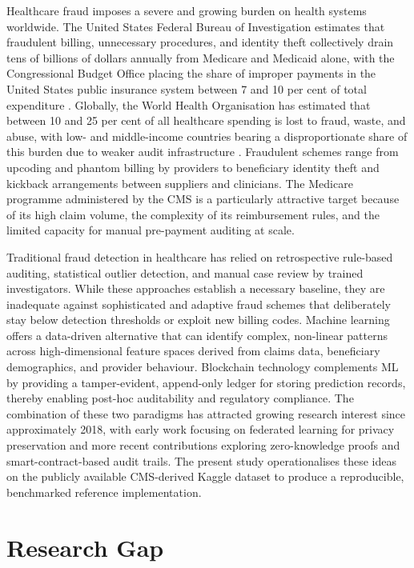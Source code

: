 Healthcare fraud imposes a severe and growing burden on health systems worldwide.
The United States Federal Bureau of Investigation estimates that fraudulent
billing, unnecessary procedures, and identity theft collectively drain tens of
billions of dollars annually from Medicare and Medicaid alone, with the
Congressional Budget Office placing the share of improper payments in the United
States public insurance system between 7 and 10 per cent of total expenditure
\cite{fbi2021,cbo2022}. Globally, the World Health Organisation has estimated
that between 10 and 25 per cent of all healthcare spending is lost to fraud,
waste, and abuse, with low- and middle-income countries bearing a
disproportionate share of this burden due to weaker audit infrastructure
\cite{who2010}. Fraudulent schemes range from upcoding and phantom billing by
providers to beneficiary identity theft and kickback arrangements between
suppliers and clinicians. The Medicare programme administered by the CMS is a
particularly attractive target because of its high claim volume, the complexity
of its reimbursement rules, and the limited capacity for manual pre-payment
auditing at scale.

Traditional fraud detection in healthcare has relied on retrospective rule-based
auditing, statistical outlier detection, and manual case review by trained
investigators. While these approaches establish a necessary baseline, they are
inadequate against sophisticated and adaptive fraud schemes that deliberately
stay below detection thresholds or exploit new billing codes. Machine learning
offers a data-driven alternative that can identify complex, non-linear patterns
across high-dimensional feature spaces derived from claims data, beneficiary
demographics, and provider behaviour. Blockchain technology complements ML by
providing a tamper-evident, append-only ledger for storing prediction records,
thereby enabling post-hoc auditability and regulatory compliance. The combination
of these two paradigms has attracted growing research interest since approximately
2018, with early work focusing on federated learning for privacy preservation and
more recent contributions exploring zero-knowledge proofs and smart-contract-based
audit trails. The present study operationalises these ideas on the publicly
available CMS-derived Kaggle dataset to produce a reproducible, benchmarked
reference implementation.

\section{Research Gap}

